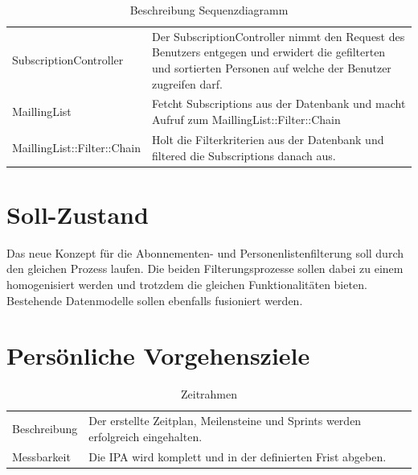 \begin{table}[h!]
   \begin{tabular}{|L{0.4\textwidth}|L{0.5\textwidth}|}
       \hline
         \\[12pt]
       \hline
       SubscriptionController & Der SubscriptionController nimmt den Request des Benutzers entgegen und erwidert die gefilterten und sortierten Personen auf welche der Benutzer zugreifen darf. \\
       \hline
       MaillingList & Fetcht Subscriptions aus der Datenbank und macht Aufruf zum MaillingList::Filter::Chain \\
       \hline
       MaillingList::Filter::Chain & Holt die Filterkriterien aus der Datenbank und filtered die Subscriptions danach aus. \\
       \hline
     \end{tabular}
     \caption{Beschreibung Sequenzdiagramm}
\end{table}

\section{Soll-Zustand}
Das neue Konzept für die Abonnementen- und Personenlistenfilterung soll durch den gleichen Prozess laufen. 
Die beiden Filterungsprozesse sollen dabei zu einem homogenisiert werden und trotzdem die gleichen Funktionalitäten bieten.
Bestehende Datenmodelle sollen ebenfalls fusioniert werden.

\section{Persönliche Vorgehensziele}
\begin{table}[h!]
   \begin{tabular}{|L{0.4\textwidth}|L{0.5\textwidth}|}
       \hline
         \\[12pt]
       \hline
        Beschreibung & Der erstellte Zeitplan, Meilensteine und Sprints werden erfolgreich eingehalten. \\
       \hline
       Messbarkeit & Die IPA wird komplett und in der definierten Frist abgeben. \\
       \hline
     \end{tabular}
     \caption{Zeitrahmen}
\end{table}

